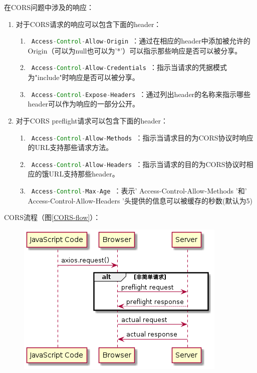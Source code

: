 \begin{enumerate}
\begin{enumerate}
        \end{enumerate}
        在CORS问题中涉及的响应：
        \begin{enumerate}
          \item 对于CORS请求的响应可以包含下面的header：
                \begin{enumerate}
                  \item \lstinline[language = Java]| Access-Control-Allow-Origin |：通过在相应的header中添加被允许的Origin（可以为null也可以为'*'）可以指示那些响应是否可以被分享。
                  \item \lstinline[language = Java]| Access-Control-Allow-Credentials |：指示当请求的凭据模式为"include"时响应是否可以被分享。
                  \item \lstinline[language = Java]| Access-Control-Expose-Headers |：通过列出header的名称来指示哪些header可以作为响应的一部分公开。
                \end{enumerate}
          \item 对于CORS preflight请求可以包含下面的header：
                \begin{enumerate}
                  \item \lstinline[language = Java]| Access-Control-Allow-Methods |：指示当请求目的为CORS协议时响应的URL支持那些请求方法。
                  \item \lstinline[language = Java]| Access-Control-Allow-Headers |：指示当请求的目的为CORS协议时相应的饿URL支持那些header。
                  \item \lstinline[language = Java]| Access-Control-Max-Age |：表示' Access-Control-Allow-Methods '和' Access-Control-Allow-Headers '头提供的信息可以被缓存的秒数(默认为5)
                \end{enumerate}
        \end{enumerate}
        CORS流程（图\ref{CORS-flow}）：
        \begin{figure}[H]
          \centering
          \includegraphics[scale = 0.6]{out/uml/时序图/CORS-flow/CORS-flow.png}

\end{figure}
\end{enumerate}
